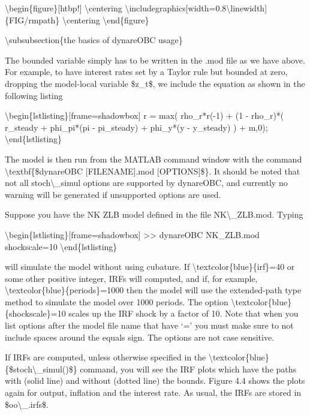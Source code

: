 \documentclass[10pt,math=newtx,citestyle=gb7714-2015,bibstyle=gb7714-2015]{elegantbook}
\begin{document}
	\textbackslash{}begin\{figure\}[htbp!]
	\textbackslash{}centering
	\textbackslash{}includegraphics[width=0.8\textbackslash{}linewidth]\{FIG/rmpath\}
	\textbackslash{}centering
	\textbackslash{}end\{figure\}
	
	\textbackslash{}subsubsection\{the basics of dynareOBC usage\}
	
	The bounded variable simply has to be written in the .mod file as we have above. For example, to have interest rates set by a Taylor rule but bounded at zero, dropping the model-local variable \$z\_t\$, we include the equation as shown
	in the following listing
	
	\textbackslash{}begin\{lstlisting\}[frame=shadowbox]
	r = max( rho\_r*r(-1) + (1 - rho\_r)*( r\_steady + phi\_pi*(pi -
	pi\_steady) + phi\_y*(y - y\_steady) ) + m,0);
	\textbackslash{}end\{lstlisting\}
	
	The model is then run from the MATLAB command window with the command \textbackslash{}textbf\{\$dynareOBC [FILENAME].mod [OPTIONS]\$\}. It should be noted that not all stoch\textbackslash{}\_simul options are supported by dynareOBC, and currently no warning will be generated if unsupported options are used.
	
	Suppose you have the NK ZLB model defined in the file NK\textbackslash{}\_ZLB.mod. Typing
	
	\textbackslash{}begin\{lstlisting\}[frame=shadowbox]
	>> dynareOBC NK\_ZLB.mod shockscale=10
	\textbackslash{}end\{lstlisting\}
	
	will simulate the model without using cubature. If \textbackslash{}textcolor\{blue\}\{irf\}=40 or some other positive integer, IRFs will computed, and if, for example, \textbackslash{}textcolor\{blue\}\{periods\}=1000 then the model will use the extended-path type method to simulate the model over 1000
	periods. The option \textbackslash{}textcolor\{blue\}\{shockscale\}=10 scales up the IRF shock by a factor of 10. Note that when you list options after the model file name that have ‘=’ you
	must make sure to not include spaces around the equals sign. The options are not case sensitive.
	
	If IRFs are computed, unless otherwise specified in the \textbackslash{}textcolor\{blue\}\{\$stoch\textbackslash{}\_simul()\$\} command, you will see the IRF plots which have the paths with (solid line) and without (dotted line) the bounds. Figure 4.4 shows the plots again for output, inflation and the interest rate. As usual, the IRFs are stored in \$oo\textbackslash{}\_.irfs\$.
	
\end{document}
